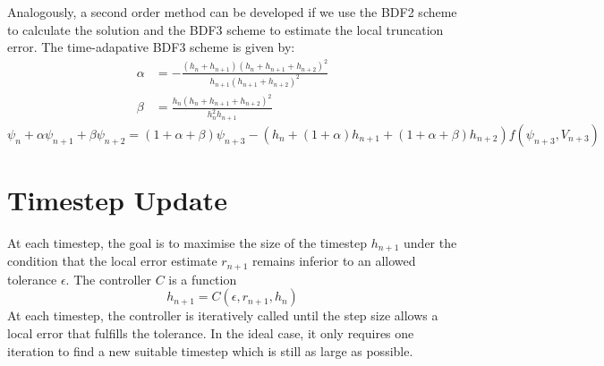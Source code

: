 Analogously, a second order method can be developed if we use the BDF2 scheme to calculate the solution and the BDF3 scheme to estimate the local truncation error. The time-adapative BDF3 scheme is given by: 
\begin{align}
    \alpha &= -\frac{\left(h_n+h_{n+1}\right)\left(h_n+h_{n+1}+h_{n+2}\right)^2}
    {h_{n+1}\left(h_{n+1}+h_{n+2}\right)^2} \\
    \beta &= \frac{h_n\left(h_n+h_{n+1}+h_{n+2}\right)^2}
    {h_{n}^2h_{n+1}}
\end{align}
\begin{equation}
    \psi_n + \alpha \psi_{n+1} + \beta \psi_{n+2} = (1+\alpha+\beta)\psi_{n+3} - \left(h_n + (1+\alpha)h_{n+1} + (1+\alpha+\beta)h_{n+2}\right)f(\psi_{n+3},V_{n+3})
\end{equation}

\section{Timestep Update}
At each timestep, the goal is to maximise the size of the timestep $h_{n+1}$ under the condition that the local error  estimate $r_{n+1}$ remains inferior to an allowed tolerance $\epsilon$. The controller $C$ is a function 
\begin{equation}
    h_{n+1} = C(\epsilon, r_{n+1},h_n)
\end{equation}
At each timestep, the controller is iteratively called until the step size allows a local error that fulfills the tolerance. In the ideal case, it only requires one iteration to find a new suitable timestep which is still as large as possible.

